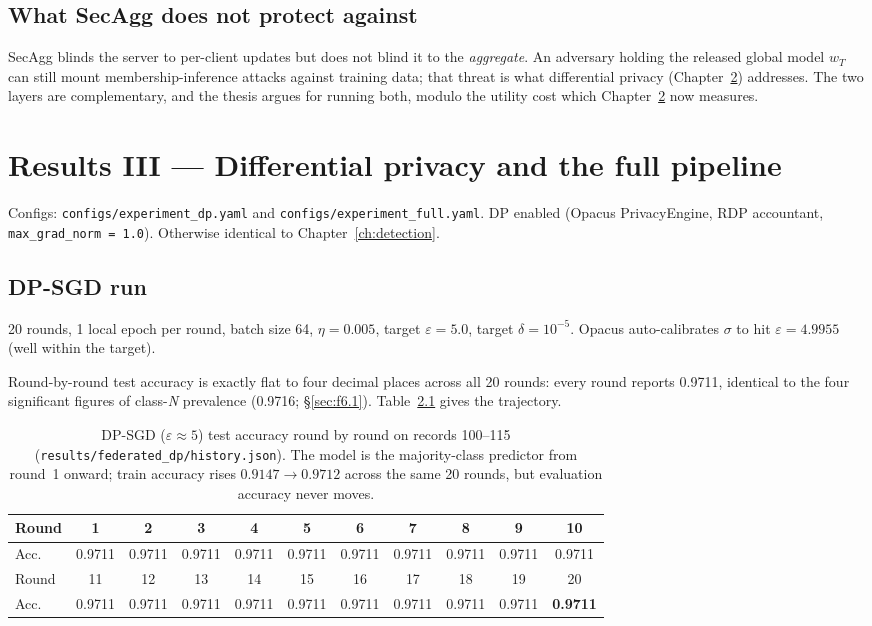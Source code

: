 \documentclass[11pt,a4paper]{report}
\begin{document}
\section{What SecAgg does not protect against}

SecAgg blinds the server to per-client updates but does not blind it
to the \emph{aggregate}. An adversary holding the released global
model $w_T$ can still mount membership-inference attacks against
training data; that threat is what differential privacy
(Chapter~\ref{ch:dp}) addresses. The two layers are complementary,
and the thesis argues for running both, modulo the utility cost
which Chapter~\ref{ch:dp} now measures.

\chapter{Results III --- Differential privacy and the full pipeline}\label{ch:dp}

Configs: \texttt{configs/experiment\_dp.yaml} and
\texttt{configs/experiment\_full.yaml}. DP enabled (Opacus PrivacyEngine,
RDP accountant, \texttt{max\_grad\_norm = 1.0}). Otherwise identical to
Chapter~\ref{ch:detection}.

\section{DP-SGD run}

20 rounds, 1 local epoch per round, batch size 64, $\eta = 0.005$,
target $\varepsilon = 5.0$, target $\delta = 10^{-5}$.
Opacus auto-calibrates $\sigma$ to hit
$\varepsilon = 4.9955$ (well within the target).

Round-by-round test accuracy is exactly flat to four decimal places
across all 20 rounds: every round reports 0.9711, identical to the four
significant figures of class-\emph{N} prevalence (0.9716;
\S\ref{sec:f6.1}). Table~\ref{tab:dp-convergence} gives the trajectory.

\begin{table}[h]
  \centering
  \caption{DP-SGD ($\varepsilon\!\approx\!5$) test accuracy round by
  round on records 100--115
  (\texttt{results/federated\_dp/history.json}). The model is the
  majority-class predictor from round~1 onward; train accuracy rises
  $0.9147 \to 0.9712$ across the same 20 rounds, but evaluation
  accuracy never moves.}
  \label{tab:dp-convergence}
  \begin{tabular}{lcccccccccc}
    \toprule
    Round & 1 & 2 & 3 & 4 & 5 & 6 & 7 & 8 & 9 & 10 \\
    \midrule
    Acc.\ & 0.9711 & 0.9711 & 0.9711 & 0.9711 & 0.9711 & 0.9711 & 0.9711 & 0.9711 & 0.9711 & 0.9711 \\
    \midrule
    Round & 11 & 12 & 13 & 14 & 15 & 16 & 17 & 18 & 19 & 20 \\
    \midrule
    Acc.\ & 0.9711 & 0.9711 & 0.9711 & 0.9711 & 0.9711 & 0.9711 & 0.9711 & 0.9711 & 0.9711 & \textbf{0.9711} \\
    \bottomrule
  \end{tabular}
\end{table}
\end{document}
